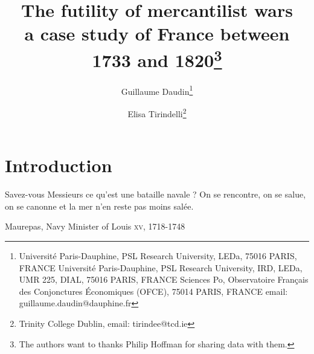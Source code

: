 \documentclass[12pt,a4paper,titlepage,english]{article}
\author{
  Guillaume Daudin\thanks{Université Paris-Dauphine, PSL Research University, LEDa, 75016 PARIS, FRANCE Université Paris-Dauphine, PSL Research University, IRD, LEDa, UMR 225, DIAL, 75016 PARIS, FRANCE Sciences Po, Observatoire Français des Conjonctures Économiques (OFCE), 75014 PARIS, FRANCE email: guillaume.daudin@dauphine.fr}
  \and
  Elisa Tirindelli\thanks{Trinity College Dublin, email: tirindee@tcd.ie}
}
\title{The futility of mercantilist wars \\ a case study of France between 1733 and 1820\thanks{The authors want to thanks Philip Hoffman for sharing data with them.}}
\date{}
\begin{document}
\maketitle






%

\section{Introduction}

\epigraph{Savez-vous Messieurs ce qu’est une bataille navale ? On se rencontre, on se salue, on se canonne et la mer n’en reste pas moins salée.}{Maurepas, Navy Minister of Louis  \textsc{xv}, 1718-1748}



\maketitle
\end{document}
